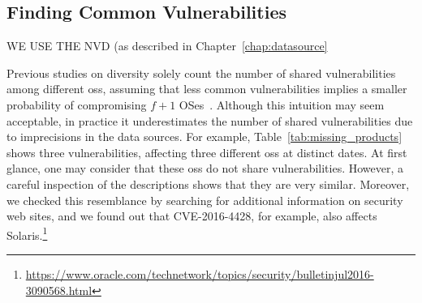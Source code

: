 \subsection{Finding Common Vulnerabilities}

WE USE THE NVD (as described in Chapter~\ref{chap:datasource}


Previous studies on diversity solely count the number of shared vulnerabilities among different \glspl{os}, assuming that less common vulnerabilities implies a smaller probability of compromising $f+1$ OSes~\cite{Garcia:2014}. 
Although this intuition may seem acceptable, in practice it underestimates the number of shared vulnerabilities due to imprecisions in the data sources. 
For example, Table~\ref{tab:missing_products} shows three vulnerabilities, affecting three different \glspl{os} at distinct dates.
At first glance, one may consider that these \glspl{os} do not share vulnerabilities.
However, a careful inspection of the descriptions shows that they are very similar.
Moreover, we checked this resemblance by searching for additional information on security web sites, and we found out that CVE-2016-4428, for example, also affects Solaris.\footnote{\url{https://www.oracle.com/technetwork/topics/security/bulletinjul2016-3090568.html}}

